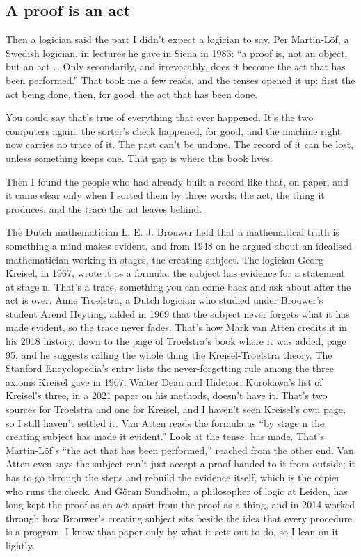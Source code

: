 \documentclass[11pt,twoside]{article}
\theoremstyle{thielethm}
\theoremstyle{thieledef}
\theoremstyle{thieledef}
\theoremstyle{thieledef}
\theoremstyle{thielethm}
\theoremstyle{thieleobs}
\theoremstyle{thielethm}
\begin{document}
\subsection{A proof is an act}

Then a logician said the part I didn't expect a logician to say. Per Martin-Löf, a Swedish logician, in lectures he gave in Siena in 1983: ``a proof is, not an object, but an act \ldots{} Only secondarily, and irrevocably, does it become the act that has been performed.'' That took me a few reads, and the tenses opened it up: first the act being done, then, for good, the act that has been done.

You could say that's true of everything that ever happened. It's the two computers again: the sorter's check happened, for good, and the machine right now carries no trace of it. The past can't be undone. The record of it can be lost, unless something keeps one. That gap is where this book lives.

Then I found the people who had already built a record like that, on paper, and it came clear only when I sorted them by three words: the act, the thing it produces, and the trace the act leaves behind.

The Dutch mathematician L. E. J. Brouwer held that a mathematical truth is something a mind makes evident, and from 1948 on he argued about an idealised mathematician working in stages, the creating subject. The logician Georg Kreisel, in 1967, wrote it as a formula: the subject has evidence for a statement at stage n. That's a trace, something you can come back and ask about after the act is over. Anne Troelstra, a Dutch logician who studied under Brouwer's student Arend Heyting, added in 1969 that the subject never forgets what it has made evident, so the trace never fades. That's how Mark van Atten credits it in his 2018 history, down to the page of Troelstra's book where it was added, page 95, and he suggests calling the whole thing the Kreisel-Troelstra theory. The Stanford Encyclopedia's entry lists the never-forgetting rule among the three axioms Kreisel gave in 1967. Walter Dean and Hidenori Kurokawa's list of Kreisel's three, in a 2021 paper on his methods, doesn't have it. That's two sources for Troelstra and one for Kreisel, and I haven't seen Kreisel's own page, so I still haven't settled it. Van Atten reads the formula as ``by stage n the creating subject has made it evident.'' Look at the tense: has made. That's Martin-Löf's ``the act that has been performed,'' reached from the other end. Van Atten even says the subject can't just accept a proof handed to it from outside; it has to go through the steps and rebuild the evidence itself, which is the copier who runs the check. And Göran Sundholm, a philosopher of logic at Leiden, has long kept the proof as an act apart from the proof as a thing, and in 2014 worked through how Brouwer's creating subject sits beside the idea that every procedure is a program. I know that paper only by what it sets out to do, so I lean on it lightly.
\end{document}
